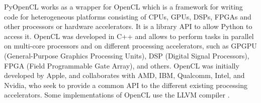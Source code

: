 PyOpenCL works as a wrapper for OpenCL which is a framework for writing code for heterogeneous platforms consisting of CPUs, GPUs, DSPs, FPGAs and other processors or hardware accelerators. It is a library API to allow Python to access it. OpenCL was developed in C++ and allows to perform tasks in parallel on multi-core processors and on different processing accelerators, such as GPGPU (General-Purpose Graphics Processing Units), DSP (Digital Signal Processors), FPGA (Field Programmable Gate Array), and others. OpenCL was initially developed by Apple, and collaborates with AMD, IBM, Qualcomm, Intel, and Nvidia, who seek to provide a common API to the different existing processing accelerators. Some implementations of OpenCL use the LLVM compiler \cite{Klockner2012}.

